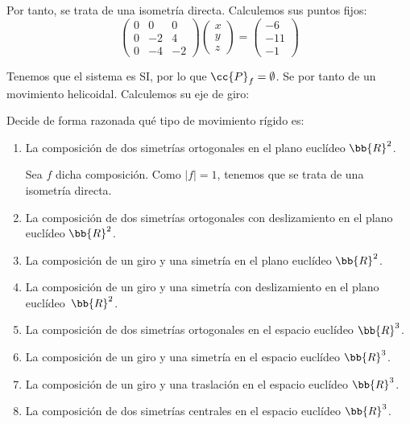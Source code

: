 \begin{ejercicio}
    Por tanto, se trata de una isometría directa. Calculemos sus puntos fijos:
    \begin{equation*}
        \left(
        \begin{array}{ccc}
            0 & 0 & 0 \\
            0 & -2 & 4 \\
            0 & -4 & -2
        \end{array}
        \right)
        \left(
        \begin{array}{c}
            x \\ y \\ z
        \end{array}
        \right)
        = \left(
        \begin{array}{c}
            -6 \\ -11 \\ -1
        \end{array}
        \right)
    \end{equation*}

    Tenemos que el sistema es SI, por lo que $\cc{P}_f=\emptyset$. Se por tanto de un movimiento helicoidal. Calculemos su eje de giro:
\end{ejercicio}

\begin{ejercicio}
    Decide de forma razonada qué tipo de movimiento rígido es:
    \begin{enumerate}
        \item La composición de dos simetrías ortogonales en el plano euclídeo $\bb{R}^2$.
        
        Sea $f$ dicha composición. Como $|f|=1$, tenemos que se trata de una isometría directa.
        \item La composición de dos simetrías ortogonales con deslizamiento en el plano euclídeo $\bb{R}^2$.
        \item La composición de un giro y una simetría en el plano euclídeo $\bb{R}^2$.
        \item La composición de un giro y una simetría con deslizamiento en el plano euclídeo~$\bb{R}^2$.
        \item La composición de dos simetrías ortogonales en el espacio euclídeo $\bb{R}^3$.
        \item La composición de un giro y una simetría en el espacio euclídeo $\bb{R}^3$.
        \item La composición de un giro y una traslación en el espacio euclídeo $\bb{R}^3$.
        \item La composición de dos simetrías centrales en el espacio euclídeo $\bb{R}^3$.
    \end{enumerate}
\end{ejercicio}

